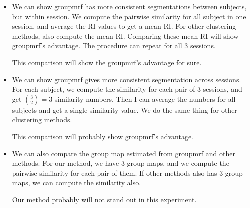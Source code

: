 \documentclass[final,authoryear,5p,twocolumn]{elsarticle}
\begin{document}
\begin{itemize}
\item We can show \textsf{groupmrf} has more consistent segmentations between
  subjects, but within session. We compute the pairwise similarity for all
  subject in one session, and average the RI values to get a mean RI. For
  other clustering methods, also compute the mean RI. Comparing these mean RI
  will show \textsf{groupmrf}'s advantage. The procedure can repeat for all 3
  sessions.

  This comparison will show the \textsf{groupmrf}'s advantage for sure.
  
\item We can show \textsf{groupmrf} gives more consistent segmentation across
  sessions. For each subject, we compute the similarity for each pair of 3
  sessions, and get ${3 \choose 2} = 3$ similarity numbers. Then I can average
  the numbers for all subjects and get a single similarity value. We do the
  same thing for other clustering methods.

  This comparison will probably show \textsf{groupmrf}'s advantage.

\item We can also compare the group map estimated from \textsf{groupmrf} and
  other methods. For our method, we have 3 group maps, and we compute the
  pairwise similarity for each pair of them. If other methods also has 3 group
  maps, we can compute the similarity also.
  
  Our method probably will not stand out in this experiment.
\end{itemize}




\end{document}
